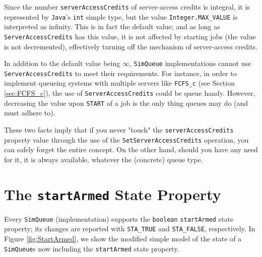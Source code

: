 Since the number
  \lstinline|serverAccessCredits|
  of server-access credits is integral,
  it is represented by \lstinline|Java|'s
  \lstinline|int| simple type,
  but the value
  \lstinline|Integer.MAX_VALUE|
  is interpreted as infinity.
This is in fact the default value;
  and as long as \lstinline|ServerAccessCredits|
  has this value,
  it is not affected by starting jobs
  (the value is not decremented),
  effectively turning off the mechanism of
  server-access credits.

\begin{sloppypar}
In addition to the default value being $\infty$,
  \lstinline|SimQueue| implementations
  cannot use \lstinline|ServerAccessCredits|
  to meet their requirements.
For instance, in order to implement queueing
  systems with multiple servers like
  \lstinline|FCFS_c|
  (see Section \ref{sec:FCFS_c}),
  the use of
  \lstinline|ServerAccessCredits|
  could be queue handy.
However, decreasing the value upon \lstinline|START|
  of a job is the only thing queues may do
  (and must adhere to).
\end{sloppypar}

These two facts imply that
  if you never "touch"
  the \lstinline|serverAccessCredits|
  property value
  through the use of the
  \lstinline|SetServerAccessCredits| operation,
  you can safely forget the entire concept.
On the other hand,
  should you have any need for it,
  it is always available,
  whatever the (concrete) queue type.

\section{The \texttt{startArmed} State Property}
\label{sec:start-armed}

Every \lstinline|SimQueue| (implementation)
  supports the \lstinline|boolean|
  \lstinline|startArmed| state property;
  its changes are reported
  with \lstinline|STA_TRUE|
  and \lstinline|STA_FALSE|,
  respectively.
In Figure \ref{fig:StartArmed},
  we show the modified simple model of the state of
  a \lstinline|SimQueue|s
  now including the \lstinline|startArmed|
  state property.

